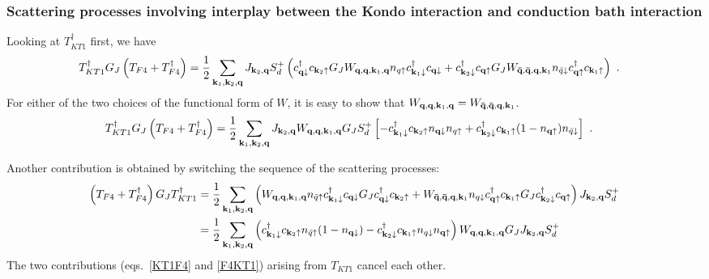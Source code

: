 \subsubsection*{Scattering processes involving interplay between the Kondo interaction and conduction bath interaction}
Looking at \(T_{KT1}^\dagger\) first, we have
\begin{equation}\begin{aligned}\label{t7t6}
	T_{KT1}^\dagger G_J \left(T_{F4} + T_{F4}^\dagger\right) &= \frac{1}{2}\sum_{{\bf k}_1,{\bf k}_2,{\bf q}} J_{{\bf k}_2, {\bf q}}S_d^+ \left(c^\dagger_{{\bf q}\downarrow}c_{{\bf k}_2\uparrow}  G_J W_{{\bf q}, {\bf q}, {\bf k}_1, {\bf q}} n_{q \uparrow} c^\dagger_{{\bf k}_1 \downarrow} c_{{\bf q} \downarrow} + c^\dagger_{{\bf k}_2\downarrow}c_{{\bf q}\uparrow}  G_J W_{{\bf \bar q}, {\bf \bar q}, {\bf q}, {\bf k}_1} n_{\bar q \downarrow} c^\dagger_{{\bf q} \uparrow} c_{{\bf k}_1 \uparrow}\right) ~.
\end{aligned}\end{equation}
For either of the two choices of the functional form of \(W\), it is easy to show that \(W_{{\bf q}, {\bf q}, {\bf k}_1, {\bf q}} = W_{{\bf \bar q}, {\bf \bar q}, {\bf q}, {\bf k}_1}\).
\begin{equation}\begin{aligned}\label{KT1F4}
	T_{KT1}^\dagger G_J \left(T_{F4} + T_{F4}^\dagger\right) &= \frac{1}{2}\sum_{{\bf k}_1,{\bf k}_2,{\bf q}} J_{{\bf k}_2, {\bf q}} W_{{\bf q}, {\bf q}, {\bf k}_1, {\bf q}} G_J S_d^+ \left[-c^\dagger_{{\bf k}_1 \downarrow}c_{{\bf k}_2\uparrow} n_{{\bf q}\downarrow} n_{q \uparrow} + c^\dagger_{{\bf k}_2\downarrow} c_{{\bf k}_1 \uparrow} (1 - n_{{\bf q}\uparrow}) n_{\bar q \downarrow}\right] ~.
\end{aligned}\end{equation}

Another contribution is obtained by switching the sequence of the scattering processes:
\begin{equation}\begin{aligned}\label{F4KT1}
	\left(T_{F4} + T_{F4}^\dagger\right) G_J T_{KT1}^\dagger &= \frac{1}{2}\sum_{{\bf k}_1,{\bf k}_2,{\bf q}} \left(W_{{\bf q}, {\bf q}, {\bf k}_1, {\bf q}} n_{\bar q \uparrow} c^\dagger_{{\bf k}_1 \downarrow} c_{{\bf q} \downarrow} G_J c^\dagger_{{\bf q}\downarrow}c_{{\bf k}_2\uparrow} + W_{{\bf \bar q}, {\bf \bar q}, {\bf q}, {\bf k}_1} n_{q \downarrow} c^\dagger_{{\bf q} \uparrow} c_{{\bf k}_1 \uparrow} G_J c^\dagger_{{\bf k}_2\downarrow}c_{{\bf q}\uparrow} \right) J_{{\bf k}_2, {\bf q}}S_d^+\\
															 &= \frac{1}{2}\sum_{{\bf k}_1,{\bf k}_2,{\bf q}} \left(c^\dagger_{{\bf k}_1 \downarrow} c_{{\bf k}_2\uparrow} n_{\bar q \uparrow} (1 - n_{{\bf q} \downarrow}) - c^\dagger_{{\bf k}_2\downarrow}c_{{\bf k}_1 \uparrow}n_{q \downarrow} n_{{\bf q} \uparrow}\right) W_{{\bf q}, {\bf q}, {\bf k}_1, {\bf q}} G_J J_{{\bf k}_2, {\bf q}}S_d^+
\end{aligned}\end{equation}
The two contributions (eqs.~\ref{KT1F4} and \ref{F4KT1}) arising from \(T_{KT1}\) cancel each other.

